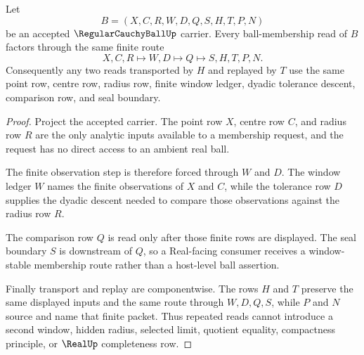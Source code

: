 \begin{theorem}
\label{thm:regular-cauchy-ball-window-stability}
Let
$$
B=(X,C,R,W,D,Q,S,H,T,P,N)
$$
be an accepted $\RegularCauchyBallUp$ carrier. Every ball-membership read of $B$ factors through the same finite route
$$
X,C,R\longmapsto W,D\longmapsto Q\longmapsto S,H,T,P,N .
$$
Consequently any two reads transported by $H$ and replayed by $T$ use the same point row, centre row, radius row, finite window ledger, dyadic tolerance descent, comparison row, and seal boundary.
\end{theorem}
\begin{proof}
Project the accepted carrier. The point row $X$, centre row $C$, and radius row $R$ are the only analytic inputs available to a membership request, and the request has no direct access to an ambient real ball.

The finite observation step is therefore forced through $W$ and $D$. The window ledger $W$ names the finite observations of $X$ and $C$, while the tolerance row $D$ supplies the dyadic descent needed to compare those observations against the radius row $R$.

The comparison row $Q$ is read only after those finite rows are displayed. The seal boundary $S$ is downstream of $Q$, so a Real-facing consumer receives a window-stable membership route rather than a host-level ball assertion.

Finally transport and replay are componentwise. The rows $H$ and $T$ preserve the same displayed inputs and the same route through $W,D,Q,S$, while $P$ and $N$ source and name that finite packet. Thus repeated reads cannot introduce a second window, hidden radius, selected limit, quotient equality, compactness principle, or $\RealUp$ completeness row.
\end{proof}

